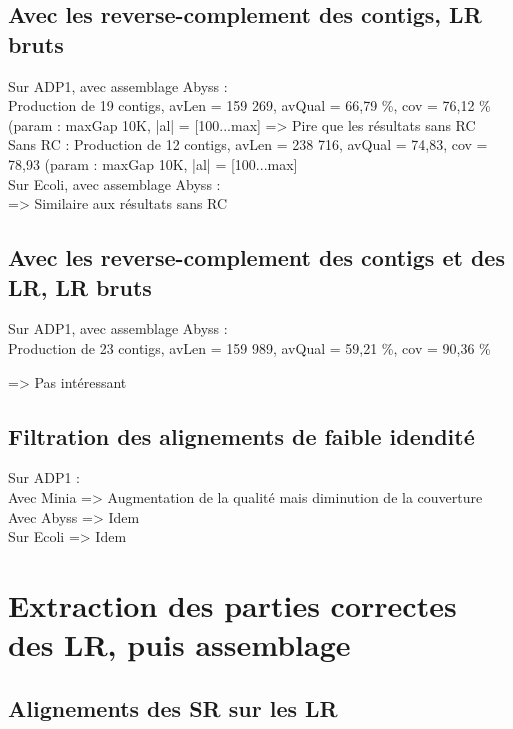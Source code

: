 \documentclass[12pt]{article}
\begin{document}
\subsection{Avec les reverse-complement des contigs, LR bruts}

Sur ADP1, avec assemblage Abyss : \\

Production de 19 contigs, avLen = 159 269, avQual = 66,79 \%, cov = 76,12 \% (param : maxGap 10K, |al| = [100...max] => Pire que les résultats sans RC \\

Sans RC : Production de 12 contigs, avLen = 238 716, avQual = 74,83, cov = 78,93 (param : maxGap 10K, |al| = [100...max] \\

Sur Ecoli, avec assemblage Abyss : \\

=> Similaire aux résultats sans RC

\subsection{Avec les reverse-complement des contigs et des LR, LR bruts}

Sur ADP1, avec assemblage Abyss : \\

Production de 23 contigs, avLen = 159 989, avQual = 59,21 \%, cov = 90,36 \%

=> Pas intéressant

\subsection{Filtration des alignements de faible idendité}

Sur ADP1 : \\

Avec Minia => Augmentation de la qualité mais diminution de la couverture \\

Avec Abyss => Idem \\

Sur Ecoli => Idem

\section{Extraction des parties correctes des LR, puis assemblage}

\subsection{Alignements des SR sur les LR}
\end{document}
